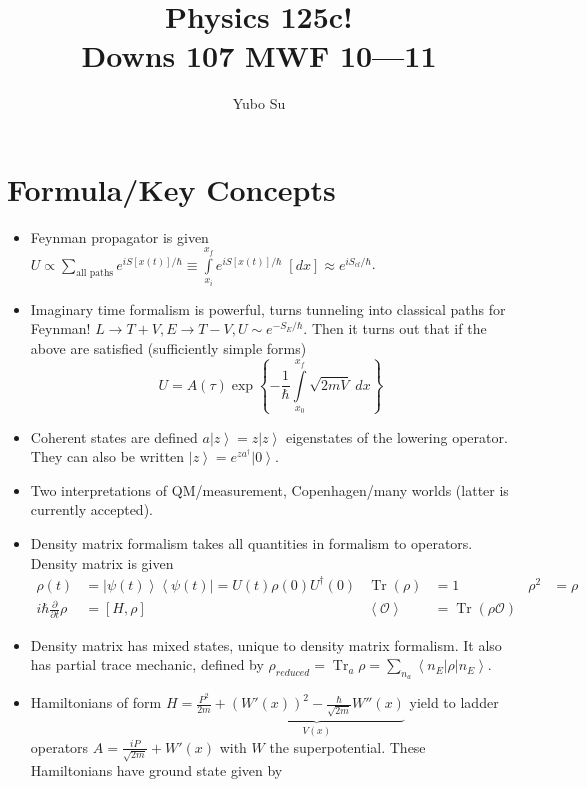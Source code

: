 \documentclass[10pt]{report}
\newcommand{\bra}[1]{\left<#1\right|}
\newcommand{\ket}[1]{\left|#1\right>}
\newcommand{\pd}[2]{\frac{\partial #1}{\partial#2}}
\newcommand{\expvalue}[1]{\left<#1\right>}
\DeclareMathOperator{\Tr}{Tr}
\begin{document}
\title{Physics 125c!\\ Downs 107 MWF 10---11}
\author{Yubo Su}
\date{}

\maketitle
\tableofcontents

\chapter{Formula/Key Concepts}

\begin{itemize}
    \item Feynman propagator is given $U \propto \sum_{\text{all paths}}^{} e^{iS[x(t)]/\hbar} \equiv \int\limits_{x_i}^{x_f}e^{iS[x(t)]/\hbar}\;[dx] \approx e^{iS_{cl}/\hbar}$. 
    \item Imaginary time formalism is powerful, turns tunneling into classical paths for Feynman! $L \to T + V, E \to T - V, U \sim e^{-S_E/\hbar}$. Then it turns out that if the above are satisfied (sufficiently simple forms)
        \begin{equation}
            U = A(\tau) \exp\left\{ -\frac{1}{\hbar}\int\limits_{x_0}^{x_f}\sqrt{2mV}\;dx \right\}
        \end{equation}
    \item Coherent states are defined $a\ket{z} = z\ket{z}$ eigenstates of the lowering operator. They can also be written $\ket{z} = e^{za^\dagger}\ket{0}$.
    \item Two interpretations of QM/measurement, Copenhagen/many worlds (latter is currently accepted).
    \item Density matrix formalism takes all quantities in formalism to operators. Density matrix is given
        \begin{align}
            \rho(t) &= \ket{\psi(t)}\bra{\psi(t)} = U(t)\rho(0)U^\dagger(0) & \Tr(\rho) &= 1 & \rho^2 &= \rho\\
            i\hbar \pd{}{t}\rho &= \left[ H,\rho \right] & \expvalue{\mathcal{O}} &= \Tr(\rho\mathcal{O})
        \end{align}
    \item Density matrix has mixed states, unique to density matrix formalism. It also has partial trace mechanic, defined by $\rho_{reduced} = \Tr_a \rho = \sum_{n_a}^{}\bra{n_E}\rho\ket{n_E}$. 
    \item Hamiltonians of form $H = \frac{P^2}{2m} + \underbrace{\left( W'(x) \right)^2 - \frac{\hbar}{\sqrt{2m}}W''(x)}_{V(x)}$ yield to ladder operators $A = \frac{iP}{\sqrt{2m}} + W'(x)$ with $W$ the superpotential. These Hamiltonians have ground state given by

\end{itemize}
\end{document}
